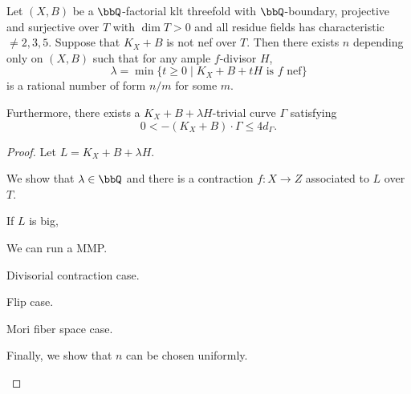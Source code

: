     \begin{lemma}\label{lem:bend_break_type_lemma}
        Let \((X,B)\) be a \(\bbQ\)-factorial klt threefold with \(\bbQ\)-boundary, projective and surjective over \(T\) with \(\dim T >0\) and all residue fields has characteristic \(\neq 2,3,5\).
        Suppose that \(K_X + B\) is not nef over \(T\).
        Then there exists \(n\) depending only on \((X,B)\) such that for any ample \(f\)-divisor \(H\), 
        \[ \lambda = \min \{t \geq 0 \mid K_X + B + tH \text{ is } f\text{ nef}\} \]
        is a rational number of form \(n/m\) for some \(m\).

        Furthermore, there exists a \(K_X+B+\lambda H\)-trivial curve \(\Gamma\) satisfying
        \[ 0 < -(K_X + B) \cdot \Gamma \leq 4d_\Gamma. \]
    \end{lemma}
    \begin{proof}
        Let \(L = K_X + B + \lambda H\).
        \begin{step}
            We show that \(\lambda \in \bbQ\) and there is a contraction \(f:X \to Z\) associated to \(L\) over \(T\).
        \end{step}
        \begin{subproof}
            If \(L\) is big, 
        \end{subproof}

        \begin{step}
            We can run a MMP.
        \end{step}

        \begin{step}
            Divisorial contraction case.
        \end{step}

        \begin{step}
            Flip case.
        \end{step}

        \begin{step}
            Mori fiber space case.
        \end{step}

        \begin{step}
            Finally, we show that \(n\) can be chosen uniformly.
        \end{step}
    \end{proof}

   